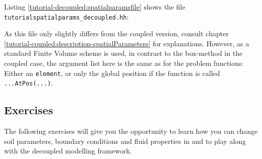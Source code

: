 Listing \ref{tutorial-decoupled:spatialparamsfile} shows the file
\verb+tutorialspatialparams_decoupled.hh+:

\begin{lst}\label{tutorial-decoupled:spatialparamsfile} \mbox{}

\end{lst}
As this file only slightly differs from the coupled version, consult
chapter \ref{tutorial-coupled:description-spatialParameters} for explanations.
However, as a standard Finite Volume scheme is used, in contrast to the box-method
in the coupled case, the argument list here is the same as for the problem
functions: Either an \texttt{element}, or only the global position if the function is called \texttt{...AtPos(...)}.

\subsection{Exercises}
\label{tutorial-deoucpled:exercises}
The following exercises will give you the opportunity to learn how you can change
soil parameters, boundary conditions and fluid properties in \Dumux and to play along
with the decoupled modelling framework.

